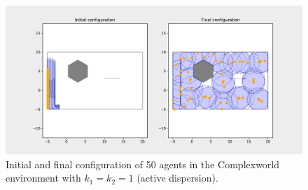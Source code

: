 \begin{figure}[H]
  \centering
  \includegraphics[width=\textwidth]{figs/complexworld_50_agnt_k_1_1_k_2_1_distr.pdf}
  \caption{Initial and final configuration of 50 agents in the Complexworld environment with $k_{1} = k_{2} = 1$ (active dispersion).}
  \label{fig:50_agnt_cw_k_1_1_k_2_1_distr}
\end{figure}

